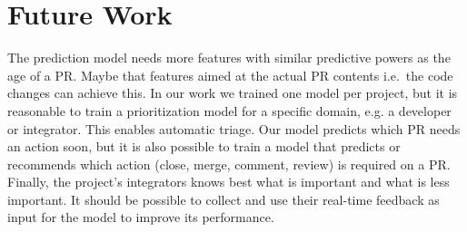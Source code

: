 \section{Future Work}
\label{sec:future}
The prediction model needs more features with similar predictive powers as the age of a PR.
Maybe that features aimed at the actual PR contents i.e.\ the code changes can achieve this.
In our work we trained one model per project, but it is reasonable to train a prioritization model for a specific domain, e.g. a developer or integrator.
This enables automatic triage.
Our model predicts which PR needs an action soon, but it is also possible to train a model that predicts or recommends which action (close, merge, comment, review) is required on a PR.
Finally, the project's integrators knows best what is important and what is less important.
It should be possible to collect and use their real-time feedback as input for the model to improve its performance.


